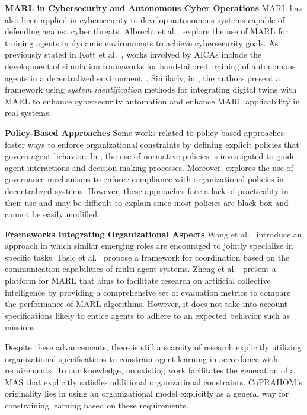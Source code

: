 \documentclass[conference]{IEEEtran}
\begin{document}
\textbf{MARL in Cybersecurity and Autonomous Cyber Operations} \quad
MARL has also been applied in cybersecurity to develop autonomous systems capable of defending against cyber threats. Albrecht et al.~\cite{Albrecht2024} explore the use of MARL for training agents in dynamic environments to achieve cybersecurity goals.
As previously stated in Kott et al.~\cite{Kott2023}, works involved by AICAs include the development of simulation frameworks for hand-tailored training of autonomous agents in a decentralized environment~\cite{Drasar2020}.
Similarly, in \cite{Hammar2022}, the authors present a framework using \emph{system identification} methods for integrating digital twins with MARL to enhance cybersecurity automation and enhance MARL applicability in real systems.

\textbf{Policy-Based Approaches} \quad
Some works related to policy-based approaches foster ways to enforce organizational constraints by defining explicit policies that govern agent behavior. In \cite{krupanski2015norm}, the use of normative policies is investigated to guide agent interactions and decision-making processes. Moreover, \cite{vos2020governing} explores the use of governance mechanisms to enforce compliance with organizational policies in decentralized systems. However, these approaches face a lack of practicality in their use and may be difficult to explain since most policies are black-box and cannot be easily modified.

\textbf{Frameworks Integrating Organizational Aspects} \quad
Wang et al.~\cite{Wang2020} introduce an approach in which similar emerging roles are encouraged to jointly specialize in specific tasks. Tosic et al.~\cite{Tosic2010} propose a framework for coordination based on the communication capabilities of multi-agent systems. Zheng et al.~\cite{Zheng2018} present a platform for MARL that aims to facilitate research on artificial collective intelligence by providing a comprehensive set of evaluation metrics to compare the performance of MARL algorithms. However, it does not take into account specifications likely to entice agents to adhere to an expected behavior such as missions.


Despite these advancements, there is still a scarcity of research explicitly utilizing organizational specifications to constrain agent learning in accordance with requirements. To our knowledge, no existing work facilitates the generation of a MAS that explicitly satisfies additional organizational constraints. CoPRAHOM's originality lies in using an organizational model explicitly as a general way for constraining learning based on these requirements.
\end{document}
